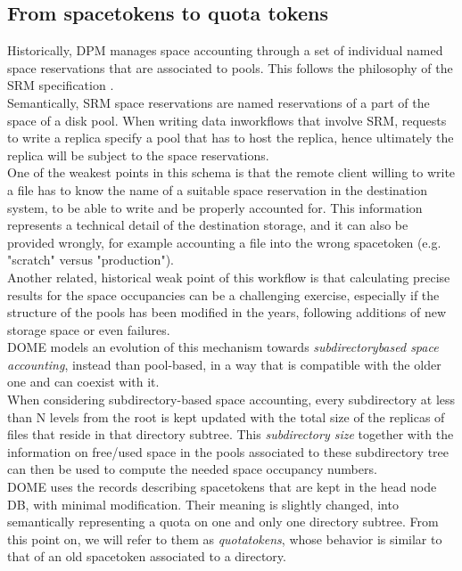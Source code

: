 \documentclass[a4paper]{jpconf}
\begin{document}
\subsection{From spacetokens to quota tokens}
Historically, DPM manages space accounting through a set of individual named space reservations that are associated to pools. This follows the
philosophy of the SRM specification \cite{BIB}.\\
Semantically, SRM space reservations are named reservations of a part of the space of a disk pool. When  writing data
inworkflows that involve SRM, requests to write a replica specify a pool
that has to host the replica, hence ultimately the replica will be subject to the space reservations.\\

One of the weakest points in this schema is that the remote client willing to write a file
has to know the name of a suitable space reservation in the destination system, to be able to write
and be properly accounted for. This information represents a technical detail
of the destination storage, and it can also  be provided wrongly, for example accounting
a file into the wrong spacetoken (e.g. "scratch" versus "production").\\

Another related, historical weak point of this workflow is that calculating precise results for the space occupancies can be a challenging exercise,
especially if the structure of the pools has been modified in the years, following additions of new storage space or
even failures.\\
DOME models an evolution of this mechanism towards \textit{subdirectory\-based space accounting}, instead than pool-based, in a way
that is compatible with the older one and can coexist with it.\\

When considering subdirectory-based space accounting, every subdirectory at less than N levels from the root is kept
updated with the total size of the replicas of files that reside in that directory subtree.
This \textit{subdirectory size} together with the information on free/used space in the pools associated to these subdirectory tree
can then be used to compute the needed space occupancy numbers.\\

DOME uses the records describing spacetokens that are kept in the head node DB, with minimal modification. Their meaning is slightly changed,
into semantically representing a quota on one and only one directory subtree. From this point on, we will refer to them as \textit{quotatokens},
whose behavior is similar to that of an old spacetoken associated to a directory.\\
\end{document}
